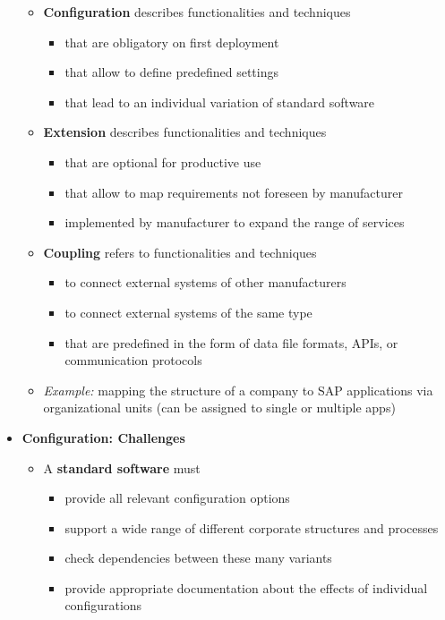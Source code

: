 \documentclass[ieeetran]{article}
\begin{document}
\begin{itemize}
\begin{itemize}
	       \item \textbf{Configuration} describes functionalities and techniques
		       \begin{itemize}
		         \item that are obligatory on first deployment
				 \item that allow to define predefined settings
			\item that lead to an individual variation of standard software
		       \end{itemize}

	\item \textbf{Extension} describes functionalities and techniques
		\begin{itemize}
		  \item that are optional for productive use
			  \item that allow to map requirements not foreseen by manufacturer
				  \item implemented by manufacturer to expand the range of services
		\end{itemize}

		\item \textbf{Coupling} refers to functionalities and techniques
			\begin{itemize}
			  \item to connect external systems of other manufacturers
				  \item to connect external systems of the same type
				\item that are predefined in the form of data file formats, APIs, or communication protocols
			\end{itemize}


		\item \textit{Example:} mapping the structure of a company to SAP applications via organizational units (can be assigned to single or multiple apps)
	\end{itemize}

	\item \textbf{Configuration: Challenges}
		\begin{itemize}
		  \item A \textbf{standard software} must
			  \begin{itemize}
			    \item provide all relevant configuration options
			\item support a wide range of different corporate structures and processes
			\item check dependencies between these many variants
			\item provide appropriate documentation about the effects of individual configurations


\end{itemize}
\end{itemize}
\end{itemize}
\end{document}
